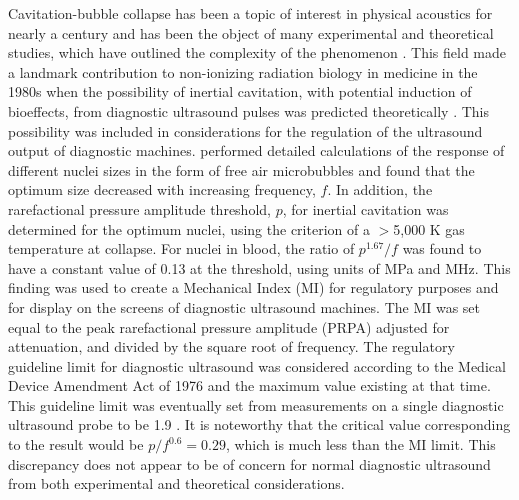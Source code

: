 Cavitation-bubble collapse has been a topic of interest in physical
acoustics for nearly a century and has been the object of many
experimental and theoretical studies, which have outlined the
complexity of the phenomenon \cite[]{leighton1997}.  This field made a
landmark contribution to non-ionizing radiation biology in medicine in
the 1980s when the possibility of inertial cavitation, with potential
induction of bioeffects, from diagnostic ultrasound pulses was
predicted theoretically \cite[]{Flynn1982,Apfel1982}.  This
possibility was included in considerations for the regulation of the
ultrasound output of diagnostic machines.  \cite{apfel1991} performed
detailed calculations of the response of different nuclei sizes in
the form of free air microbubbles and found that the optimum size
decreased with increasing frequency, $f$.  In addition, the
rarefactional pressure amplitude threshold, $p$, for inertial
cavitation was determined for the optimum nuclei, using the criterion
of a $>$5,000 K gas temperature at collapse.  For nuclei in blood, the
ratio of $p^{1.67}/f$ was found to have a constant value of 0.13 at
the threshold, using units of MPa and MHz.  This finding was used to
create a Mechanical Index (MI) for regulatory purposes and for display
on the screens of diagnostic ultrasound machines.  The MI was set
equal to the peak rarefactional pressure amplitude (PRPA) adjusted for
attenuation, and divided by the square root of frequency.  The
regulatory guideline limit for diagnostic ultrasound was considered
according to the Medical Device Amendment Act of 1976 and the maximum
value existing at that time.  This guideline limit was eventually set
from measurements on a single diagnostic ultrasound probe to be 1.9
\cite[]{nyborg2001}.  It is noteworthy that the critical value
corresponding to the \cite{apfel1991} result would be
\textbf{$p/f^{0.6}=0.29$}, which is much less than the MI limit.  This
discrepancy does not appear to be of concern for normal diagnostic
ultrasound from both experimental \cite[]{carstensen2000} and
theoretical \cite[]{church2002} considerations.

